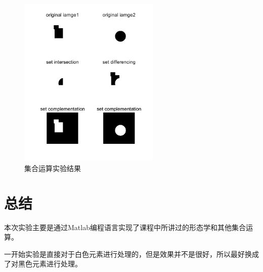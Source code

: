 \documentclass{../source/Experiment}
\begin{document}
\begin{figure}[H]
    \centering
    \includegraphics[width = 0.6\textwidth]{第四次/f2.png}
    \caption{集合运算实验结果}
\end{figure}

\section{总结}
本次实验主要是通过Matlab编程语言实现了课程中所讲过的形态学和其他集合运算。

一开始实验是直接对于白色元素进行处理的，但是效果并不是很好，所以最好换成了对黑色元素进行处理。
\end{document}
